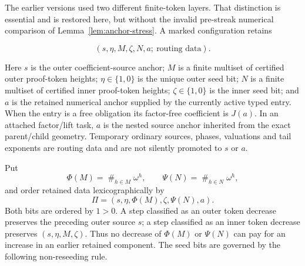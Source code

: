 The earlier versions used two different finite-token layers.  That distinction
is essential and is restored here, but without the invalid pre-streak numerical
comparison of Lemma~\ref{lem:anchor-stress}.  A marked configuration retains

\[
  (s,\eta,M,\zeta,N,a;\ \text{routing data}).
\]

Here $s$ is the outer coefficient-source anchor; $M$ is a finite multiset of
certified outer proof-token heights; $\eta\in\{1,0\}$ is the unique outer
seed bit; $N$ is a finite multiset of certified inner proof-token heights;
$\zeta\in\{1,0\}$ is the inner seed bit; and $a$ is the retained numerical
anchor supplied by the currently active typed entry.  When the entry is a
free obligation its factor-free coefficient is $J(a)$.  In an attached
factor/lift task, $a$ is the nested source anchor inherited from the exact
parent/child geometry.  Temporary ordinary sources, phases, valuations and
tail exponents are routing data and are not silently promoted to $s$ or $a$.

Put
\[
 \Phi(M)=\mathop{\#}_{h\in M}\omega^h,
 \qquad
 \Psi(N)=\mathop{\#}_{h\in N}\omega^h,
\]
and order retained data lexicographically by
\begin{equation}\label{eq:v6-rank}
 \boxed{\Pi=(s,\eta,\Phi(M),\zeta,\Psi(N),a).}
\end{equation}
Both bits are ordered by $1>0$.  A step classified as an outer token
decrease preserves the preceding outer source $s$; a step classified as an
inner token decrease preserves $(s,\eta,M,\zeta)$.  Thus no decrease of
$\Phi(M)$ or $\Psi(N)$ can pay for an increase in an earlier retained
component.  The seed bits are governed by the following non-reseeding rule.

